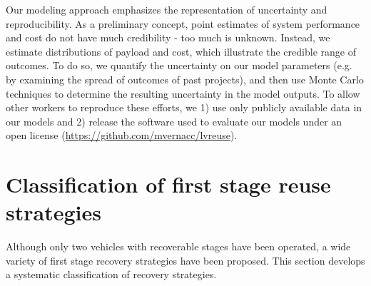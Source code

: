 \documentclass[conf]{new-aiaa}
\begin{document}
\begin{multicols}{2}
Our modeling approach emphasizes the representation of uncertainty and reproducibility. As a preliminary concept, point estimates of system performance and cost do not have much credibility - too much is unknown. Instead, we estimate distributions of payload and cost, which illustrate the credible range of outcomes. To do so, we quantify the uncertainty on our model parameters (e.g. by examining the spread of outcomes of past projects), and then use Monte Carlo techniques to determine the resulting uncertainty in the model outputs. To allow other workers to reproduce these efforts, we 1) use only publicly available data in our models and 2) release the software used to evaluate our models under an open license (\url{https://github.com/mvernacc/lvreuse}).

\section{Classification of first stage reuse strategies}
Although only two vehicles with recoverable stages have been operated, a wide variety of first stage recovery strategies have been proposed. This section develops a systematic classification of recovery strategies.


\end{multicols}
\end{document}
